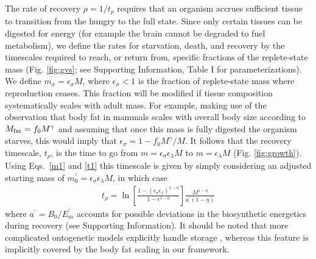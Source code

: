 \documentclass{pnastwo}
\begin{document}
\begin{article}
The rate of recovery $\rho = 1/t_\rho$ requires that an organism accrues
sufficient tissue to transition from the hungry to the full state.  Since
only certain tissues can be digested for energy (for example the brain cannot
be degraded to fuel metabolism), we define the rates for starvation, death,
and recovery by the timescales required to reach, or return from, specific
fractions of the replete-state mass (Fig. \ref{fig:gvs}; see Supporting Information, Table I for parameterizations).  We define
$m_{\sigma}=\epsilon_{\sigma} M$, where $\epsilon_{\sigma}<1$ is the fraction of
replete-state mass where reproduction ceases. This fraction will be modified
if tissue composition systematically scales with adult mass.  For example,
making use of the observation that body fat in mammals scales with overall
body size according to $M_{\rm fat}=f_{0}M^{\gamma}$ and assuming that once
this mass is fully digested the organism starves, this would imply that
$\epsilon_{\sigma}=1-f_{0}M^{\gamma}/M$. It follows that the
recovery timescale, $t_{\rho}$, is the time to go from
$m=\epsilon_{\sigma} \epsilon_{\lambda} M$ to $m=\epsilon_{\lambda}M$ (Fig. \ref{fig:growth}). Using Eqs.~\eqref{m1} and \eqref{t1} this timescale is given by simply considering an adjusted starting mass of $m_{0}^{\prime}=\epsilon_{\sigma}\epsilon_{\lambda}M$, in which case
\begin{eqnarray}
t_{\rho}=\ln\left[\frac{1-\left(\epsilon_{\sigma}\epsilon_{\lambda}\right)^{1-\eta}}{1-\epsilon^{1-\eta}}\right]\frac{M^{1-\eta}}{a^{\prime}\left(1-\eta\right)}
\end{eqnarray}
where $a^{\prime}=B_{0}/E_{m}^{\prime}$ accounts for possible deviations in the biosynthetic energetics during recovery (see Supporting Information). It should be noted that more complicated ontogenetic models explicitly handle
storage \cite{hou}, whereas this feature is implicitly covered by the body
fat scaling in our framework.


\end{article}
\end{document}
